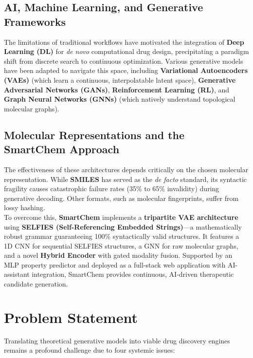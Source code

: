 \documentclass[12pt,a4paper]{report}
\begin{document}
\subsection{AI, Machine Learning, and Generative Frameworks}

The limitations of traditional workflows have motivated the integration of \textbf{Deep Learning (DL)} for \textit{de novo} computational drug design, precipitating a paradigm shift from discrete search to continuous optimization. Various generative models have been adapted to navigate this space, including \textbf{Variational Autoencoders (VAEs)} (which learn a continuous, interpolatable latent space), \textbf{Generative Adversarial Networks (GANs)}, \textbf{Reinforcement Learning (RL)}, and \textbf{Graph Neural Networks (GNNs)} (which natively understand topological molecular graphs).

\subsection{Molecular Representations and the SmartChem Approach}

The effectiveness of these architectures depends critically on the chosen molecular representation. While \textbf{SMILES} has served as the \textit{de facto} standard, its syntactic fragility causes catastrophic failure rates (35\% to 65\% invalidity) during generative decoding. Other formats, such as molecular fingerprints, suffer from lossy hashing. \\

To overcome this, \textbf{SmartChem} implements a \textbf{tripartite VAE architecture} using \textbf{SELFIES (Self-Referencing Embedded Strings)}—a mathematically robust grammar guaranteeing 100\% syntactically valid structures. It features a 1D CNN for sequential SELFIES structures, a GNN for raw molecular graphs, and a novel \textbf{Hybrid Encoder} with gated modality fusion. Supported by an MLP property predictor and deployed as a full-stack web application with AI-assistant integration, SmartChem provides continuous, AI-driven therapeutic candidate generation.

\section{Problem Statement}

Translating theoretical generative models into viable drug discovery engines remains a profound challenge due to four systemic issues:
\end{document}
